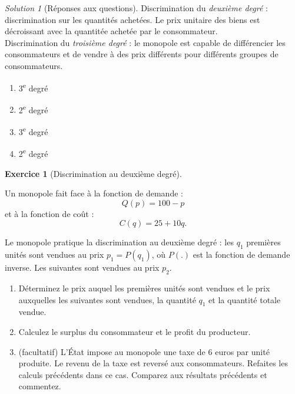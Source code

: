 \documentclass[
]{book}
\providecommand{\tightlist}{%
  \setlength{\itemsep}{0pt}\setlength{\parskip}{0pt}}
\theoremstyle{definition}
\theoremstyle{definition}
\theoremstyle{definition}
\newtheorem{exercise}{Exercice}[chapter]
\theoremstyle{definition}
\theoremstyle{remark}
\newtheorem*{solution}{Solution}
\begin{document}
\begin{solution}[Réponses aux questions]

Discrimination du \emph{deuxième degré} : discrimination sur les quantités achetées.
Le prix unitaire des biens est décroissant avec la quantitée achetée par le consommateur.\\
Discrimination du \emph{troisième degré} : le monopole est capable de différencier les consommateurs et de vendre à des prix différents pour différents groupes de consommateurs.

\begin{enumerate}
\def\labelenumi{\arabic{enumi}.}
\tightlist
\item
  3\textsuperscript{e} degré
\item
  2\textsuperscript{e} degré
\item
  3\textsuperscript{e} degré
\item
  2\textsuperscript{e} degré
\end{enumerate}

\end{solution}

\begin{exercise}[Discrimination au deuxième degré]
\protect\hypertarget{exr:discriminationexo1}{}\label{exr:discriminationexo1}

Un monopole fait face à la fonction de demande :
\[Q(p)=100-p\] et à la fonction de coût :
\[C(q)=25+10q.\]

Le monopole pratique la discrimination au deuxième degré : les \(q_1\) premières unités sont vendues au prix \(p_1=P(q_1)\), où \(P\left(.\right)\) est la fonction de demande inverse. Les suivantes sont vendues au prix \(p_2\).

\begin{enumerate}
\def\labelenumi{\arabic{enumi}.}
\tightlist
\item
  Déterminez le prix auquel les premières unités sont vendues et le prix auxquelles les suivantes sont vendues, la quantité \(q_1\) et la quantité totale vendue.
\item
  Calculez le surplus du consommateur et le profit du producteur.
\item
  (facultatif) L'État impose au monopole une taxe de 6 euros par unité produite. Le revenu de la taxe est reversé aux consommateurs. Refaites les calculs précédents dans ce cas. Comparez aux résultats précédents et commentez.
\end{enumerate}

\end{exercise}
\end{document}
